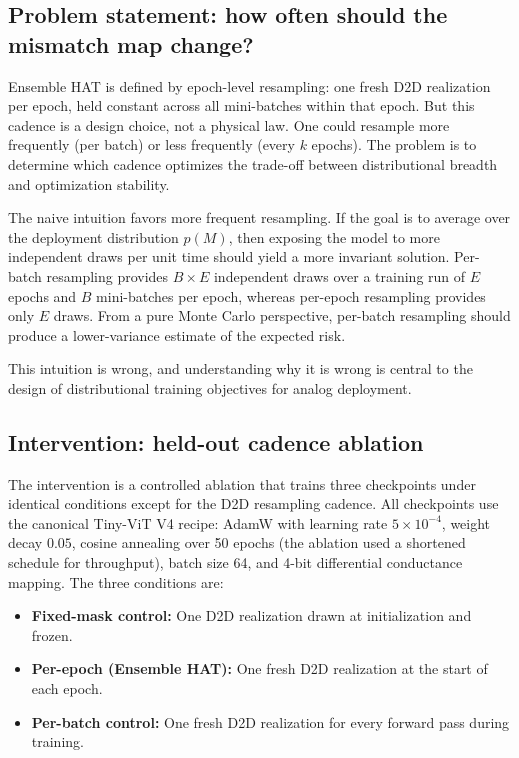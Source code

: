 \subsection{Problem statement: how often should the mismatch map change?}

Ensemble HAT is defined by epoch-level resampling: one fresh D2D realization per epoch, held constant across all mini-batches within that epoch. But this cadence is a design choice, not a physical law. One could resample more frequently (per batch) or less frequently (every $k$ epochs). The problem is to determine which cadence optimizes the trade-off between distributional breadth and optimization stability.

The naive intuition favors more frequent resampling. If the goal is to average over the deployment distribution $p(M)$, then exposing the model to more independent draws per unit time should yield a more invariant solution. Per-batch resampling provides $B\times E$ independent draws over a training run of $E$ epochs and $B$ mini-batches per epoch, whereas per-epoch resampling provides only $E$ draws. From a pure Monte Carlo perspective, per-batch resampling should produce a lower-variance estimate of the expected risk.

This intuition is wrong, and understanding why it is wrong is central to the design of distributional training objectives for analog deployment.

\subsection{Intervention: held-out cadence ablation}

The intervention is a controlled ablation that trains three checkpoints under identical conditions except for the D2D resampling cadence. All checkpoints use the canonical Tiny-ViT V4 recipe: AdamW with learning rate $5\times10^{-4}$, weight decay $0.05$, cosine annealing over 50 epochs (the ablation used a shortened schedule for throughput), batch size 64, and 4-bit differential conductance mapping. The three conditions are:
\begin{itemize}[leftmargin=1.4em]
    \item \textbf{Fixed-mask control:} One D2D realization drawn at initialization and frozen.
    \item \textbf{Per-epoch (Ensemble HAT):} One fresh D2D realization at the start of each epoch.
    \item \textbf{Per-batch control:} One fresh D2D realization for every forward pass during training.
\end{itemize}

